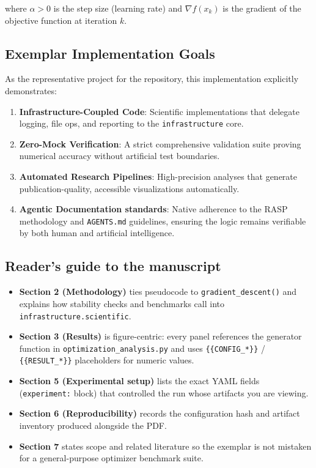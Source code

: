 \documentclass[
]{article}
\providecommand{\tightlist}{%
  \setlength{\itemsep}{0pt}\setlength{\parskip}{0pt}}
\begin{document}
where \(\alpha > 0\) is the step size (learning rate) and
\(\nabla f(x_k)\) is the gradient of the objective function at iteration
\(k\).

\subsection{Exemplar Implementation
Goals}\label{exemplar-implementation-goals}

As the representative project for the repository, this implementation
explicitly demonstrates:

\begin{enumerate}
\def\labelenumi{\arabic{enumi}.}
\tightlist
\item
  \textbf{Infrastructure-Coupled Code}: Scientific implementations that
  delegate logging, file ops, and reporting to the
  \texttt{infrastructure} core.
\item
  \textbf{Zero-Mock Verification}: A strict comprehensive validation
  suite proving numerical accuracy without artificial test boundaries.
\item
  \textbf{Automated Research Pipelines}: High-precision analyses that
  generate publication-quality, accessible visualizations automatically.
\item
  \textbf{Agentic Documentation standards}: Native adherence to the RASP
  methodology and \texttt{AGENTS.md} guidelines, ensuring the logic
  remains verifiable by both human and artificial intelligence.
\end{enumerate}

\subsection{Reader's guide to the
manuscript}\label{readers-guide-to-the-manuscript}

\begin{itemize}
\tightlist
\item
  \textbf{Section 2 (Methodology)} ties pseudocode to
  \texttt{gradient\_descent()} and explains how stability checks and
  benchmarks call into \texttt{infrastructure.scientific}.
\item
  \textbf{Section 3 (Results)} is figure-centric: every panel references
  the generator function in \texttt{optimization\_analysis.py} and uses
  \texttt{\{\{CONFIG\_*\}\}} / \texttt{\{\{RESULT\_*\}\}} placeholders
  for numeric values.
\item
  \textbf{Section 5 (Experimental setup)} lists the exact YAML fields
  (\texttt{experiment:} block) that controlled the run whose artifacts
  you are viewing.
\item
  \textbf{Section 6 (Reproducibility)} records the configuration hash
  and artifact inventory produced alongside the PDF.
\item
  \textbf{Section 7} states scope and related literature so the exemplar
  is not mistaken for a general-purpose optimizer benchmark suite.
\end{itemize}
\end{document}
